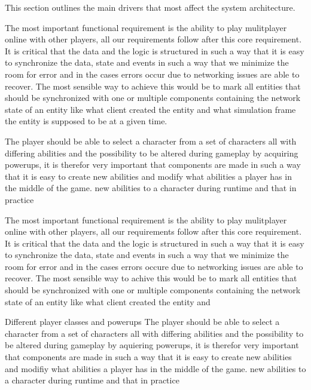 	This section outlines the main drivers that most affect the system architecture.

	The most important functional requirement is the ability to play mulitplayer online with other	players, all our requirements follow after this core requirement. It is critical that the data and the logic is structured in such a way that it is easy to synchronize the data, state and events in such a way that we minimize the room for error	and in the cases errors occur due to networking issues are able to recover. The most sensible way to achieve this would be to mark all entities 	that should be synchronized with one or multiple components containing the network state of an entity like what client created the entity and what simulation	frame the entity is supposed to be at a given time.

	The player should be able to select a character from a set of characters all with differing abilities and the possibility to be altered during gameplay by acquiring powerups, it is therefor very important that components are made in such a way that it is easy to create new abilities and modify	what abilities a player has in the middle of the game. new abilities to a character during runtime and that in practice

	The most important functional requirement is the ability to play mulitplayer online with other 
	players, all our requirements follow after this core requirement. It is critical that the data and the logic is
	structured in such a way that it is easy to synchronize the data, state and events in such a way that we minimize the room for error
	and in the cases errors occure due to networking issues are able to recover. The most sensible way to achive this would be to mark all entities
	that should be synchronized with one or multiple components containing the network state of an entity like what client created the entity and

	Different player classes and powerups
	The player should be able to select a character from a set of characters all with differing abilities and the possibility to be altered during gameplay
	by aquiering powerups, it is therefor very important that components are made in such a way that it is easy to create new abilities and modifiy
	what abilities a player has in the middle of the game. new abilities to a character during runtime and that in practice 

